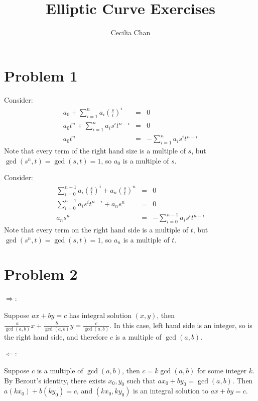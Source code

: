 \documentclass{article}
\title{Elliptic Curve Exercises}
\author{Cecilia Chan}
\begin{document}
\maketitle



\section*{Problem 1}
Consider:
\begin{eqnarray*}
  a_0 + \sum\limits_{i = 1}^{n} a_i \left(\frac{s}{t}\right)^i &=& 0                                     \\
            a_0 t^n  + \sum\limits_{i = 1}^{n} a_i s^i t^{n-i} &=& 0                                     \\
                                                   a_0 t^n &=& - \sum\limits_{i = 1}^{n} a_i s^i t^{n-i}
\end{eqnarray*}
Note that every term of the right hand size is a multiple of $ s $, but $ \gcd(s^n, t) = \gcd(s, t) = 1 $, so $ a_0 $ is a multiple of $ s $.

Consider:
\begin{eqnarray*}
  \sum\limits_{i = 0}^{n-1} a_i \left(\frac{s}{t}\right)^i + a_n \left(\frac{s}{t}\right)^n &=& 0 \\
  \sum\limits_{i = 0}^{n-1}  a_i s^i t^{n-i} + a_n s^n &=& 0 \\
  a_n s^n &=& -\sum\limits_{i = 0}^{n-1} a_i s^i t^{n-i}
\end{eqnarray*}
Note that every term on the right hand side is a multiple of $ t $, but $ \gcd(s^n, t) = \gcd(s, t) = 1 $, so $ a_n $ is a multiple of $ t $.

\section*{Problem 2}
$ \Rightarrow $:

Suppose $ ax + by = c $ has integral solution $ (x, y) $, then $ \frac{a}{\gcd(a, b)} x + \frac{b}{\gcd(a, b)} y = \frac{c}{\gcd(a, b)} $. In this case, left hand side is an integer, so is the right hand side, and therefore $ c $ is a multiple of $ \gcd(a, b) $.

$ \Leftarrow $:

Suppose $ c $ is a multiple of $ \gcd(a, b) $, then $ c = k \gcd(a, b) $ for some integer $ k $. By Bezout's identity, there exists $ x_0, y_0 $ such that $ ax_0 + by_0 = \gcd(a, b) $. Then $ a(kx_0) + b(ky_0) = c $, and $ (kx_0, ky_0) $ is an integral solution to $ ax + by = c $.
\end{document}
